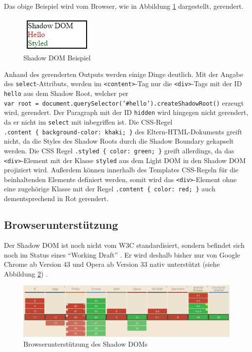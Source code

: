 Das obige Beispiel wird vom Browser, wie in Abbildung \ref{fig:shadowdombeispiel} dargestellt, gerendert.

\begin{figure}[htbp]
 \centering
 \includegraphics{kapitel2/bilder/3-shadow-dom-beispiel}
 \caption{Shadow DOM Beispiel}
 \label{fig:shadowdombeispiel}
\end{figure}

Anhand des gerenderten Outputs werden einige Dinge deutlich. Mit der Angabe des \texttt{select}-Attributs, werden im \texttt{\textless{}content\textgreater{}}-Tag nur die \texttt{\textless{}div\textgreater{}}-Tags mit der ID \texttt{hello} aus dem Shadow Root, welcher per \texttt{var\ root\ =\ document.querySelector('\#hello').createShadowRoot()} erzeugt wird, gerendert. Der Paragraph mit der ID \texttt{hidden} wird hingegen nicht gerendert, da er nicht im \texttt{select} mit inbegriffen ist. Die \ac{CSS}-Regel \texttt{.content\ \{\ background-color:\ khaki;\ \}} des Eltern-\ac{HTML}-Dokuments greift nicht, da die Styles des Shadow Roots durch die Shadow Boundary gekapselt werden. Die \ac{CSS} Regel \texttt{.styled\ \{\ color:\ green;\ \}} greift allerdings, da das \texttt{\textless{}div\textgreater{}}-Element mit der Klasse \texttt{styled} aus dem Light \ac{DOM} in den Shadow \ac{DOM} projiziert wird. Außerdem können innerhalb des Templates CSS-Regeln für die beinhaltenden Elemente definiert werden, somit wird das \texttt{\textless{}div\textgreater{}}-Element ohne eine zugehörige Klasse mit der Regel \texttt{.content\ \{\ color:\ red;\ \}} auch dementsprechend in Rot gerendert.


\subsection{Browserunterstützung}\label{shadow-dom-browserunterstuetzung}

Der Shadow \ac{DOM} ist noch nicht vom \ac{W3C} standardisiert, sondern befindet sich noch im Status eines ``Working Draft'' \cite{citeulike:13879687}. Er wird deshalb bisher nur von Google Chrome ab Version 43 und Opera ab Version 33 nativ unterstützt (siehe Abbildung \ref{fig:shadowdombrowser}) \cite{citeulike:13883407}.

\begin{figure}[htbp]
 \centering
 \includegraphics[width=\linewidth]{kapitel2/bilder/3-shadow-dom-browserunterstuetzung}
 \caption{Browserunterstützung des Shadow DOMs}
 \label{fig:shadowdombrowser}
\end{figure}
